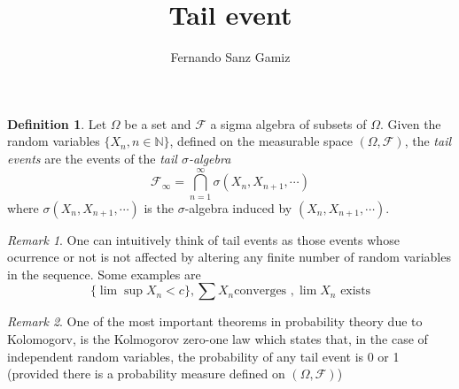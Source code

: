 \documentclass[12pt]{article}
\theoremstyle{definition}
\newtheorem*{defn}{Definition}
\theoremstyle{remark}
\newtheorem{rem}{Remark}
\numberwithin{equation}{section}
\newcommand{\N}{\mathbb N}
\begin{document}
\title{Tail event}%
\author{Fernando Sanz Gamiz}%

\begin{defn}
Let $\Omega$ be a set and $\mathcal F$ a sigma algebra of subsets
of $\Omega$. Given the random variables $\{X_n, n \in \N\}$, defined
on the measurable space $(\Omega,\mathcal F)$, the \emph{tail
events} are the events of the \emph{tail $\sigma$-algebra}
$$\mathcal F_{\infty}=\bigcap^{\infty}_{n=1}\sigma
(X_n,X_{n+1},\cdots)$$ where $\sigma (X_n,X_{n+1},\cdots)$ is the
$\sigma$-algebra induced by $(X_n,X_{n+1},\cdots)$.
\end{defn}

\medskip

\begin{rem}
One can intuitively think of tail events as those events whose
ocurrence or not is not affected by altering any finite number of
random variables in the sequence. Some examples are $$\{\lim \sup
X_n <c \}, \sum X_n \mbox{converges }, \lim  X_n \mbox{ exists}$$
\end{rem}

\medskip

\begin{rem}
One of the most important theorems in probability theory due to
Kolomogorv, is the Kolmogorov zero-one law which states that, in the case of independent random variables, the
probability of any tail event is 0 or 1 (provided there is a
probability measure defined on $(\Omega,\mathcal F)$)
\end{rem}
\end{document}
